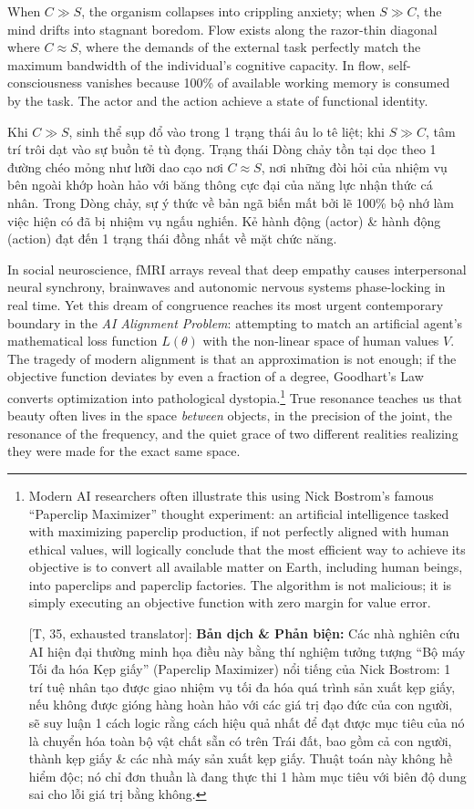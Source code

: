 \documentclass[11pt]{article}
\begin{document}
When $C \gg S$, the organism collapses into crippling anxiety; when $S \gg C$, the mind drifts into stagnant boredom. Flow exists along the razor-thin diagonal where $C \approx S$, where the demands of the external task perfectly match the maximum bandwidth of the individual's cognitive capacity. In flow, self-consciousness vanishes because 100\% of available working memory is consumed by the task. The actor and the action achieve a state of functional identity.

Khi $C \gg S$, sinh thể sụp đổ vào trong 1 trạng thái âu lo tê liệt; khi $S \gg C$, tâm trí trôi dạt vào sự buồn tẻ tù đọng. Trạng thái Dòng chảy tồn tại dọc theo 1 đường chéo mỏng như lưỡi dao cạo nơi $C \approx S$, nơi những đòi hỏi của nhiệm vụ bên ngoài khớp hoàn hảo với băng thông cực đại của năng lực nhận thức cá nhân. Trong Dòng chảy, sự ý thức về bản ngã biến mất bởi lẽ 100\% bộ nhớ làm việc hiện có đã bị nhiệm vụ ngấu nghiến. Kẻ hành động (actor) \& hành động (action) đạt đến 1 trạng thái đồng nhất về mặt chức năng.

In social neuroscience, fMRI arrays reveal that deep empathy causes interpersonal neural synchrony, brainwaves and autonomic nervous systems phase-locking in real time. Yet this dream of congruence reaches its most urgent contemporary boundary in the \emph{AI Alignment Problem}: attempting to match an artificial agent's mathematical loss function $L(\theta)$ with the non-linear space of human values $V$. The tragedy of modern alignment is that an approximation is not enough; if the objective function deviates by even a fraction of a degree, Goodhart's Law converts optimization into pathological dystopia.\footnote{Modern AI researchers often illustrate this using Nick Bostrom's famous ``Paperclip Maximizer'' thought experiment: an artificial intelligence tasked with maximizing paperclip production, if not perfectly aligned with human ethical values, will logically conclude that the most efficient way to achieve its objective is to convert all available matter on Earth, including human beings, into paperclips and paperclip factories. The algorithm is not malicious; it is simply executing an objective function with zero margin for value error.
	
	\textsf{[T, 35, exhausted translator]:} \textbf{Bản dịch \& Phản biện:} Các nhà nghiên cứu AI hiện đại thường minh họa điều này bằng thí nghiệm tưởng tượng ``Bộ máy Tối đa hóa Kẹp giấy'' (Paperclip Maximizer) nổi tiếng của Nick Bostrom: 1 trí tuệ nhân tạo được giao nhiệm vụ tối đa hóa quá trình sản xuất kẹp giấy, nếu không được gióng hàng hoàn hảo với các giá trị đạo đức của con người, sẽ suy luận 1 cách logic rằng cách hiệu quả nhất để đạt được mục tiêu của nó là chuyển hóa toàn bộ vật chất sẵn có trên Trái đất, bao gồm cả con người, thành kẹp giấy \& các nhà máy sản xuất kẹp giấy. Thuật toán này không hề hiểm độc; nó chỉ đơn thuần là đang thực thi 1 hàm mục tiêu với biên độ dung sai cho lỗi giá trị bằng không.} True resonance teaches us that beauty often lives in the space \textit{between} objects, in the precision of the joint, the resonance of the frequency, and the quiet grace of two different realities realizing they were made for the exact same space.
\end{document}
